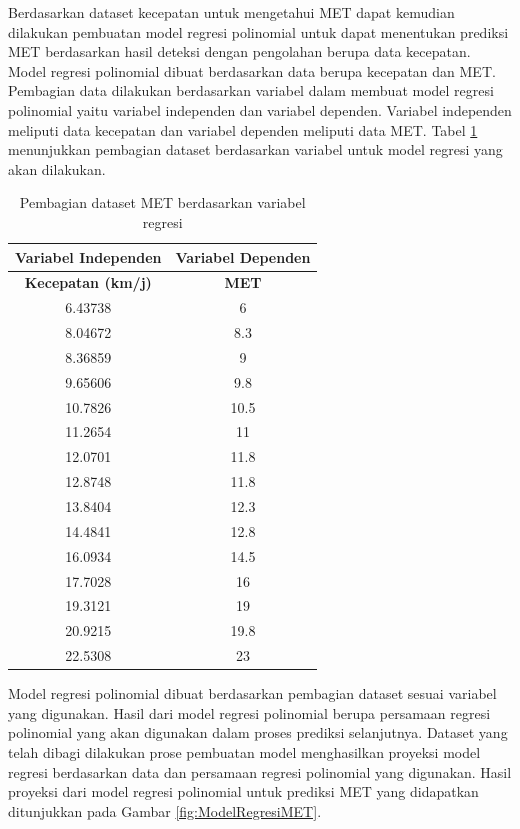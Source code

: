 Berdasarkan dataset kecepatan untuk mengetahui MET dapat kemudian dilakukan pembuatan model regresi polinomial untuk dapat menentukan prediksi MET berdasarkan hasil deteksi dengan pengolahan berupa data kecepatan. Model regresi polinomial dibuat berdasarkan data berupa kecepatan dan MET. Pembagian data dilakukan berdasarkan variabel dalam membuat model regresi polinomial yaitu variabel independen dan variabel dependen. Variabel independen meliputi data kecepatan dan variabel dependen meliputi data MET. Tabel \ref{tb:VariabelPrediksiMET} menunjukkan pembagian dataset berdasarkan variabel untuk model regresi yang akan dilakukan.

\begin{longtable}{|c|c|}
  \caption{Pembagian dataset MET berdasarkan variabel regresi}
  \label{tb:VariabelPrediksiMET}                                   \\
  \hline
  \rowcolor[HTML]{C0C0C0}
  \textbf{Variabel Independen}  & \textbf{Variabel Dependen}  \\
  \hline
  \rowcolor[HTML]{C0C0C0}
  \textbf{Kecepatan (km/j)} & \textbf{MET}  \\
  \hline
  6.43738  & 6    \\
  \hline
  8.04672   & 8.3    \\
  \hline
  8.36859   & 9    \\
  \hline
  9.65606   & 9.8    \\
  \hline
  10.7826   & 10.5    \\
  \hline
  11.2654   & 11    \\
  \hline
  12.0701   & 11.8    \\
  \hline
  12.8748   & 11.8    \\
  \hline
  13.8404   & 12.3    \\
  \hline
  14.4841   & 12.8    \\
  \hline
  16.0934   & 14.5    \\
  \hline
  17.7028   & 16    \\
  \hline
  19.3121   & 19    \\
  \hline
  20.9215   & 19.8    \\
  \hline
  22.5308   & 23    \\
  \hline
\end{longtable}

Model regresi polinomial dibuat berdasarkan pembagian dataset sesuai variabel yang digunakan. Hasil dari model regresi polinomial berupa persamaan regresi polinomial yang akan digunakan dalam proses prediksi selanjutnya. Dataset yang telah dibagi dilakukan prose pembuatan model menghasilkan proyeksi model regresi berdasarkan data dan persamaan regresi polinomial yang digunakan. Hasil proyeksi dari model regresi polinomial untuk prediksi MET yang didapatkan ditunjukkan pada Gambar \ref{fig:ModelRegresiMET}.

